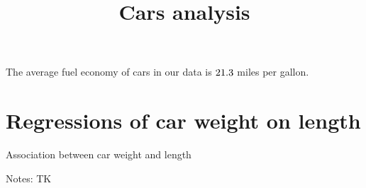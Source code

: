 \documentclass[english]{article}
\date{}
\begin{document}
\title{Cars analysis}

\maketitle

The average fuel economy of cars in our data is $21.3$ miles
per gallon.

\section{Regressions of car weight on length}

\begin{table}[H]
\caption{Association between car weight and length\textbf{\label{tab:AssocWeightLength}}}
\begin{centering}

\par
\end{centering}
\medskip{}
{\small{}Notes: TK}
\end{table}
\end{document}

